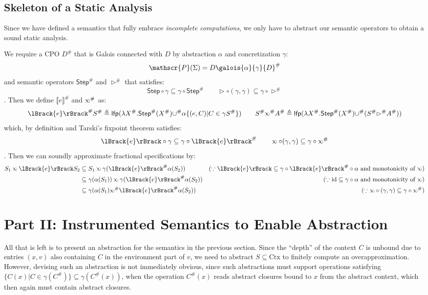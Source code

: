 \documentclass{article}
\theoremstyle{definition}
\newcommand*{\pset}{\mathscr{P}}
\newcommand*{\Abs}[1]{{#1}^{\#}}
\newcommand*{\Ctx}{\text{Ctx}}
\newcommand*{\lfp}{\mathsf{lfp}}
\newcommand*{\Step}{\mathsf{Step}}
\newcommand*{\semlink}{\mathbin{\rotatebox[origin=c]{180}{$\propto$}}}
\newcommand*{\sembracket}[1]{\lBrack{#1}\rBrack}
\begin{document}
\subsection{Skeleton of a Static Analysis}
Since we have defined a semantics that fully embrace \emph{incomplete computations}, we only have to abstract our semantic operators to obtain a sound static analysis.

We require a CPO $\Abs{D}$ that is Galois connected with $D$ by abstraction $\alpha$ and concretization $\gamma$:
\[\pset(\Sigma)=D\galois{\alpha}{\gamma}\Abs{D}\]
and semantic operators $\Abs\Step$ and $\Abs\rhd$ that satisfies:
\[\Step\circ\gamma\subseteq\gamma\circ\Abs\Step\qquad\rhd\circ(\gamma,\gamma)\subseteq\gamma\circ\Abs\rhd\]
. Then we define $\Abs{\sembracket{e}}$ and $\Abs\semlink$ as:
\[
  \Abs{\sembracket{e}}\Abs{S}\triangleq\lfp(\lambda\Abs{X}.\Abs\Step(\Abs{X})\Abs\cup\alpha\{(e,C)|C\in\gamma\Abs{S}\})\qquad
  \Abs{S}\Abs\semlink\Abs{A}\triangleq\lfp(\lambda\Abs{X}.\Abs\Step(\Abs{X})\Abs\cup(\Abs{S}\Abs\rhd\Abs{A}))
\]
which, by definition and Tarski's fixpoint theorem satisfies:
\[\sembracket{e}\circ\gamma\subseteq\gamma\circ\Abs{\sembracket{e}}\qquad\semlink\circ(\gamma,\gamma)\subseteq\gamma\circ\Abs\semlink\]
. Then we can soundly approximate fractional specifications by:
\begin{align*}
  S_1\semlink\sembracket{e}S_2 & \subseteq S_1\semlink\gamma(\Abs{\sembracket{e}}\alpha(S_2))                 & (\because\sembracket{e}\subseteq\gamma\circ\Abs{\sembracket{e}}\circ\alpha\text{ and monotonicity of }\semlink) \\
                               & \subseteq \gamma(\alpha(S_1))\semlink\gamma(\Abs{\sembracket{e}}\alpha(S_2)) & (\because\text{id}\subseteq\gamma\circ\alpha\text{ and monotonicity of }\semlink)                               \\
                               & \subseteq\gamma(\alpha(S_1)\Abs\semlink\Abs{\sembracket{e}}\alpha(S_2))      & (\because\semlink\circ(\gamma,\gamma)\subseteq\gamma\circ\Abs\semlink)
\end{align*}

\section{Part II: Instrumented Semantics to Enable Abstraction}

All that is left is to present an abstraction for the semantics in the previous section.
Since the ``depth'' of the context $C$ is unbound due to entries $(x,v)$ also containing $C$ in the environment part of $v$, we need to abstract $S\subseteq\Ctx$ to finitely compute an overapproximation.
However, devising such an abstraction is not immediately obvious, since such abstractions must support operations satisfying $\{C(x)|C\in\gamma(\Abs{C})\}\subseteq\gamma(\Abs{C}(x))$, when the operation $\Abs{C}(x)$ reads abstract closures bound to $x$ from the abstract context, which then again must contain abstract closures.
\end{document}
